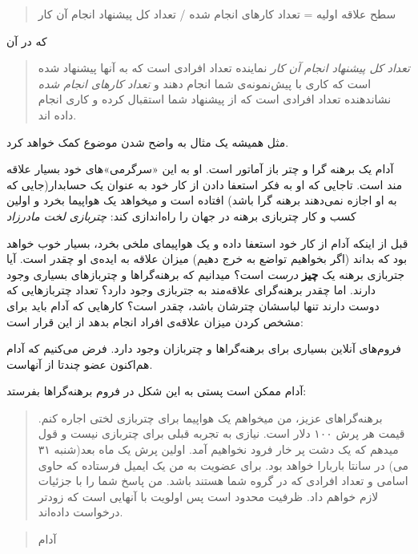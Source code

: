 \begin{quote}
سطح علاقه اولیه = تعداد کارهای انجام شده / تعداد کل پیشنهاد انجام آن کار
\end{quote}

که در آن

\begin{quote}
\emph{تعداد کل پیشنهاد انجام آن کار} نماینده تعداد افرادی است که به آنها
پیشنهاد شده است که کاری با پیش‌نمونه‌ی شما انجام دهند و \emph{تعداد
کارهای انجام شده} نشاندهنده تعداد افرادی است که از پیشنهاد شما استقبال
کرده و کاری انجام داده اند.
\end{quote}

مثل همیشه یک مثال به واضح شدن موضوع کمک خواهد کرد.

آدام یک برهنه گرا و چتر باز آماتور است. او به این «سرگرمی»های خود بسیار
علاقه مند است. تاجایی که او به فکر استعفا دادن از کار خود به عنوان یک
حسابدار(جایی که به او اجازه نمی‌دهند برهنه گرا باشد) افتاده است و
میخواهد یک هواپیما بخرد و اولین کسب و کار چتربازی برهنه در جهان را
راه‌اندازی کند: \emph{چتربازی لخت مادرزاد}

قبل از اینکه آدام از کار خود استعفا داده و یک هواپیمای ملخی بخرد، بسیار
خوب خواهد بود که بداند (اگر بخواهیم تواضع به خرج دهیم) میزان علاقه به
ایده‌ی او چقدر است. آیا جتربازی برهنه یک \textbf{چیز} \emph{درست} است؟
میدانیم که برهنه‌گراها و چتربازهای بسیاری وجود دارند. اما چقدر
برهنه‌گرای علاقه‌مند به جتربازی وجود دارد؟ تعداد چتربازهایی که دوست
دارند تنها لباسشان چترشان باشد، چقدر است؟ کارهایی که آدام باید برای مشخص
کردن میزان علاقه‌ی افراد انجام بدهد از این قرار است:

فروم‌های آنلاین بسیاری برای برهنه‌گراها و چتربازان وجود دارد. فرض
می‌کنیم که آدام هم‌اکنون عضو چندتا از آنهاست.

آدام ممکن است پستی به این شکل در فروم برهنه‌گراها بفرستد:

\begin{quote}
برهنه‌گراهای عزیز، من میخواهم یک هواپیما برای چتربازی لختی اجاره کنم.
قیمت هر پرش ۱۰۰ دلار است. نیازی به تجربه قبلی برای چتربازی نیست و قول
میدهم که یک دشت پر خار فرود نخواهیم آمد. اولین پرش یک ماه بعد(شنبه ۳۱
می) در سانتا باربارا خواهد بود. برای عضویت به من یک ایمیل فرستاده که
حاوی اسامی و تعداد افرادی که در گروه شما هستند باشد. من پاسخ شما را با
جزئیات لازم خواهم داد. ظرفیت محدود است پس اولویت با آنهایی است که زودتر
درخواست داده‌اند.
\end{quote}

\begin{quote}
آدام
\end{quote}

